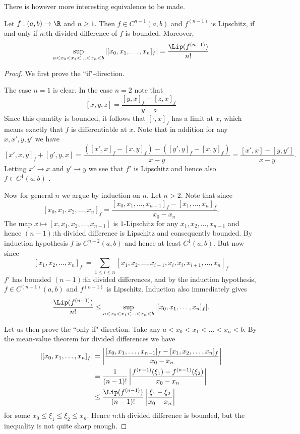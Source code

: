 There is however more interesting equivalence to be made.

\begin{lause}\label{bounded_div}
	Let $f : (a, b) \to \R$ and $n \geq 1$. Then $f \in C^{n - 1}(a, b)$ and $f^{(n - 1)}$ is Lipschitz, if and only if $n$:th divided difference of $f$ is bounded. Moreover,
	\[
		\sup_{a < x_{0} < x_{1} < \ldots < x_{n}< b} |[x_{0}, x_{1}, \ldots, x_{n}]_{f}| = \frac{\Lip(f^{(n - 1)})}{n!}
	\]
\end{lause}

\begin{proof}
	We first prove the ``if"-direction.

	The case $n = 1$ is clear. In the case $n = 2$ note that
	\[
		[x, y, z] = \frac{[y, x]_{f} - [z, x]_{f}}{y - z}
	\]
	Since this quantity is bounded, it follows that $[\cdot, x]_{f}$ has a limit at $x$, which means exactly that $f$ is differentiable at $x$. Note that in addition for any $x, x', y, y'$ we have
	\[
		[x', x, y]_{f} + [y', y, x] = \frac{([x', x]_{f} - [x, y]_{f}) - ([y', y]_{f} - [x, y]_{f})}{x - y} = \frac{[x', x] - [y, y']}{x - y}.
	\]
	Letting $x' \to x$ and $y' \to y$ we see that $f'$ is Lipschitz and hence also $f \in C^{1}(a, b)$ .

	Now for general $n$ we argue by induction on $n$. Let $n > 2$. Note that since
	\[
		[x_{0}, x_{1}, x_{2}, \ldots, x_{n}]_{f} = \frac{[x_{0}, x_{1}, \ldots, x_{n - 1}]_{f} - [x_{1}, \ldots, x_{n}]_{f}}{x_{0} - x_{n}}.
	\]
	The map $x \mapsto [x, x_{1}, x_{2}, \ldots, x_{n - 1}]$ is $1$-Lipschitz for any $x_{1}, x_{2}, \ldots, x_{n - 1}$ and hence $(n - 1)$:th divided difference is Lipschitz and consequently bounded. By induction hypothesis $f$ is $C^{n - 2}(a, b)$ and hence at least $C^{1}(a, b)$. But now since
	\[
		[x_{1}, x_{2}, \ldots, x_{n}]_{f'} = \sum_{1 \leq i \leq n} [x_{1}, x_{2}, \ldots, x_{i - 1}, x_{i}, x_{i}, x_{i + 1}, \ldots, x_{n}]_{f}
	\]
	$f'$ has bounded $(n - 1)$:th divided differences, and by the induction hypothesis, $f \in C^{(n - 1)}(a, b)$ and $f^{(n - 1)}$ is Lipschitz. Induction also immediately gives
	\[
		\frac{\Lip(f^{(n - 1)})}{n!} \leq \sup_{a < x_{0} < x_{1} < \ldots < x_{n}< b} |[x_{0}, x_{1}, \ldots, x_{n}]_{f}|.
	\]

	Let us then prove the ``only if"-direction. Take any $a < x_{0} < x_{1} < \ldots < x_{n} < b$. By the mean-value theorem for divided differences we have
	\begin{align*}
		\left|[x_{0}, x_{1}, \ldots, x_{n}]_{f} \right| &= \left|\frac{[x_{0}, x_{1}, \ldots, x_{n - 1}]_{f} - [x_{1}, x_{2}, \ldots, x_{n}]_{f}}{x_{0} - x_{n}} \right| \\
		&= \frac{1}{(n - 1)!}\left|\frac{f^{(n - 1)}(\xi_{1}) - f^{(n - 1)}(\xi_{2})}{x_{0} - x_{n}} \right| \\
		&\leq \frac{\Lip(f^{(n - 1)})}{(n - 1)!} \left|\frac{\xi_{1} - \xi_{2}}{x_{0} - x_{n}}\right|
	\end{align*}
	for some $x_{0} \leq \xi_{1} \leq \xi_{2} \leq x_{n}$. Hence $n$:th divided difference is bounded, but the inequality is not quite sharp enough.


\end{proof}
